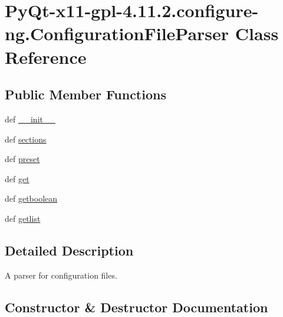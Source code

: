 \hypertarget{classPyQt-x11-gpl-4_811_82_1_1configure-ng_1_1ConfigurationFileParser}{}\section{Py\+Qt-\/x11-\/gpl-\/4.11.2.configure-\/ng.Configuration\+File\+Parser Class Reference}
\label{classPyQt-x11-gpl-4_811_82_1_1configure-ng_1_1ConfigurationFileParser}
\subsection*{Public Member Functions}
\begin{DoxyCompactItemize}
\item 
def \hyperlink{classPyQt-x11-gpl-4_811_82_1_1configure-ng_1_1ConfigurationFileParser_a15e268fc3a5ff4010aff6cada8724a12}{\+\_\+\+\_\+init\+\_\+\+\_\+}
\item 
def \hyperlink{classPyQt-x11-gpl-4_811_82_1_1configure-ng_1_1ConfigurationFileParser_ac26837230afbfcc6d44b4d566f25aa26}{sections}
\item 
def \hyperlink{classPyQt-x11-gpl-4_811_82_1_1configure-ng_1_1ConfigurationFileParser_aa01968f97f00b376ddad4e9e6bcd53f9}{preset}
\item 
def \hyperlink{classPyQt-x11-gpl-4_811_82_1_1configure-ng_1_1ConfigurationFileParser_a6c35bf88e0317a16894c63b6dc335f75}{get}
\item 
def \hyperlink{classPyQt-x11-gpl-4_811_82_1_1configure-ng_1_1ConfigurationFileParser_abeb7afb2f416bd83a1ca9507a0b5cf1a}{getboolean}
\item 
def \hyperlink{classPyQt-x11-gpl-4_811_82_1_1configure-ng_1_1ConfigurationFileParser_a9257f80eb0ac336dd98cd6a8bd038ce9}{getlist}
\end{DoxyCompactItemize}


\subsection{Detailed Description}
\begin{DoxyVerb}A parser for configuration files. \end{DoxyVerb}
 

\subsection{Constructor \& Destructor Documentation}
\hypertarget{classPyQt-x11-gpl-4_811_82_1_1configure-ng_1_1ConfigurationFileParser_a15e268fc3a5ff4010aff6cada8724a12}{}
